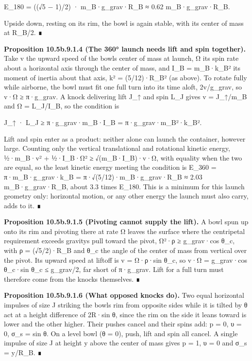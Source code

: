 \documentclass[
]{article}
\begin{document}
E\_180 = ((√5 − 1)/2) · m\_B·g\_grav·R\_B ≈ 0.62 m\_B·g\_grav·R\_B.

Upside down, resting on its rim, the bowl is again stable, with its
center of mass at R\_B/2. ∎

\textbf{Proposition 10.5b.9.1.4 (The 360° launch needs lift and spin
together).} Take v the upward speed of the bowl\textquotesingle s center
of mass at launch, Ω its spin rate about a horizontal axis through the
center of mass, and I\_B = m\_B·k\_B² its moment of inertia about that
axis, k² = (5/12)·R\_B² (as above). To rotate fully while airborne, the
bowl must fit one full turn into its time aloft, 2v/g\_grav, so v·Ω ≥
π·g\_grav. A knock delivering lift J\_↑ and spin L\_J gives v =
J\_↑/m\_B and Ω = L\_J/I\_B, so the condition is

J\_↑ · L\_J ≥ π·g\_grav·m\_B·I\_B = π·g\_grav·m\_B²·k\_B².

Lift and spin enter as a product: neither alone can launch the
container, however large. Counting only the vertical translational and
rotational kinetic energy, ½·m\_B·v² + ½·I\_B·Ω² ≥ √(m\_B·I\_B)·v·Ω,
with equality when the two are equal, so the least kinetic energy
meeting the condition is E\_360 = π·m\_B·g\_grav·k\_B =
π·√(5/12)·m\_B·g\_grav·R\_B ≈ 2.03 m\_B·g\_grav·R\_B, about 3.3 times
E\_180. This is a minimum for this launch geometry only: horizontal
motion, or any other energy the launch must also carry, adds to it. ∎

\textbf{Proposition 10.5b.9.1.5 (Pivoting cannot supply the lift).} A
bowl spun up onto its rim and pivoting there at rate Ω leaves the
surface where the centripetal requirement exceeds
gravity\textquotesingle s pull toward the pivot, Ω²·ρ ≥ g\_grav·cos
θ\_c, with ρ = (√5/2)·R\_B and θ\_c the angle of the center of mass from
vertical over the pivot. Its upward speed at liftoff is v = Ω·ρ·sin
θ\_c, so v·Ω = g\_grav·cos θ\_c·sin θ\_c ≤ g\_grav/2, far short of
π·g\_grav. Lift for a full turn must therefore come from the knocks
themselves. ∎

\textbf{Proposition 10.5b.9.1.6 (What opposed knocks do).} Two equal
horizontal impulses of size J striking the bowl\textquotesingle s rim
from opposite sides while it is tilted by θ act at a height difference
of 2R·sin θ, since the rim on the side it leans toward is lower and the
other higher. Their pushes cancel and their spins add: p = 0, υ = 0,
σ\_s = sin θ. On a level bowl (θ = 0), push, lift and spin all cancel. A
single impulse of size J at height y above the center of mass gives p =
1, υ = 0 and σ\_s = y/R\_B. ∎
\end{document}
